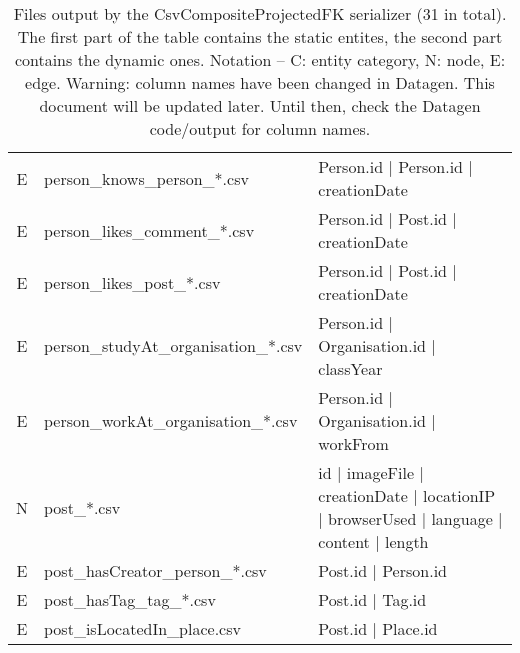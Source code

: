 \begin{table}[htb]
\begin{tabular}{|c|l|l|}
        E                    & person\_knows\_person\_*.csv            & Person.id | Person.id | creationDate                                                                       \\
        E                    & person\_likes\_comment\_*.csv           & Person.id | Post.id | creationDate                                                                         \\
        E                    & person\_likes\_post\_*.csv              & Person.id | Post.id | creationDate                                                                         \\
        E                    & person\_studyAt\_organisation\_*.csv    & Person.id | Organisation.id | classYear                                                                    \\
        E                    & person\_workAt\_organisation\_*.csv     & Person.id | Organisation.id | workFrom                                                                     \\
        \hline
        N                    & post\_*.csv                             & id | imageFile | creationDate | locationIP | browserUsed | language | content | length                     \\
        E                    & post\_hasCreator\_person\_*.csv         & Post.id | Person.id                                                                                        \\
        E                    & post\_hasTag\_tag\_*.csv                & Post.id | Tag.id                                                                                           \\
        E                    & post\_isLocatedIn\_place.csv            & Post.id | Place.id                                                                                         \\
        \hline
    \end{tabular}
    \caption{Files output by the CsvCompositeProjectedFK serializer (31 in total). The first part of the table contains the static entites, the second part contains the dynamic ones. Notation -- C: entity category, N: node, E: edge. Warning: column names have been changed in Datagen. This document will be updated later. Until then, check the Datagen code/output for column names.}
    \label{table:csv-composite-projectedfk}
\end{table}
